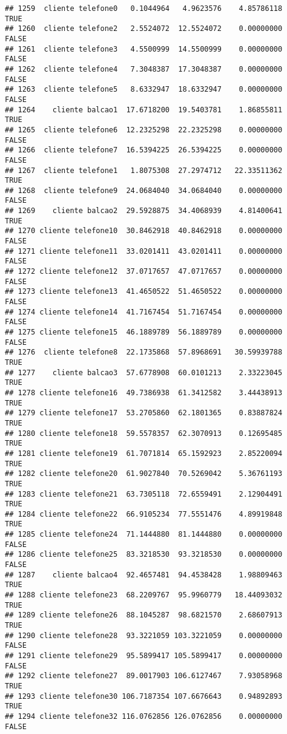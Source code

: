 \documentclass[
]{article}
\begin{document}
\begin{verbatim}
## 1259  cliente telefone0   0.1044964   4.9623576    4.85786118     TRUE
## 1260  cliente telefone2   2.5524072  12.5524072    0.00000000    FALSE
## 1261  cliente telefone3   4.5500999  14.5500999    0.00000000    FALSE
## 1262  cliente telefone4   7.3048387  17.3048387    0.00000000    FALSE
## 1263  cliente telefone5   8.6332947  18.6332947    0.00000000    FALSE
## 1264    cliente balcao1  17.6718200  19.5403781    1.86855811     TRUE
## 1265  cliente telefone6  12.2325298  22.2325298    0.00000000    FALSE
## 1266  cliente telefone7  16.5394225  26.5394225    0.00000000    FALSE
## 1267  cliente telefone1   1.8075308  27.2974712   22.33511362     TRUE
## 1268  cliente telefone9  24.0684040  34.0684040    0.00000000    FALSE
## 1269    cliente balcao2  29.5928875  34.4068939    4.81400641     TRUE
## 1270 cliente telefone10  30.8462918  40.8462918    0.00000000    FALSE
## 1271 cliente telefone11  33.0201411  43.0201411    0.00000000    FALSE
## 1272 cliente telefone12  37.0717657  47.0717657    0.00000000    FALSE
## 1273 cliente telefone13  41.4650522  51.4650522    0.00000000    FALSE
## 1274 cliente telefone14  41.7167454  51.7167454    0.00000000    FALSE
## 1275 cliente telefone15  46.1889789  56.1889789    0.00000000    FALSE
## 1276  cliente telefone8  22.1735868  57.8968691   30.59939788     TRUE
## 1277    cliente balcao3  57.6778908  60.0101213    2.33223045     TRUE
## 1278 cliente telefone16  49.7386938  61.3412582    3.44438913     TRUE
## 1279 cliente telefone17  53.2705860  62.1801365    0.83887824     TRUE
## 1280 cliente telefone18  59.5578357  62.3070913    0.12695485     TRUE
## 1281 cliente telefone19  61.7071814  65.1592923    2.85220094     TRUE
## 1282 cliente telefone20  61.9027840  70.5269042    5.36761193     TRUE
## 1283 cliente telefone21  63.7305118  72.6559491    2.12904491     TRUE
## 1284 cliente telefone22  66.9105234  77.5551476    4.89919848     TRUE
## 1285 cliente telefone24  71.1444880  81.1444880    0.00000000    FALSE
## 1286 cliente telefone25  83.3218530  93.3218530    0.00000000    FALSE
## 1287    cliente balcao4  92.4657481  94.4538428    1.98809463     TRUE
## 1288 cliente telefone23  68.2209767  95.9960779   18.44093032     TRUE
## 1289 cliente telefone26  88.1045287  98.6821570    2.68607913     TRUE
## 1290 cliente telefone28  93.3221059 103.3221059    0.00000000    FALSE
## 1291 cliente telefone29  95.5899417 105.5899417    0.00000000    FALSE
## 1292 cliente telefone27  89.0017903 106.6127467    7.93058968     TRUE
## 1293 cliente telefone30 106.7187354 107.6676643    0.94892893     TRUE
## 1294 cliente telefone32 116.0762856 126.0762856    0.00000000    FALSE

\end{verbatim}
\end{document}
